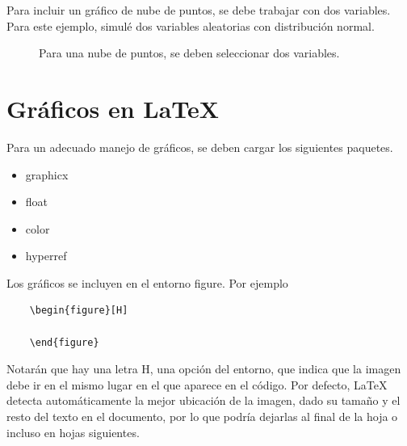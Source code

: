 \documentclass[letterpaper,11pt]{article}
\begin{document}
 Para incluir un gráfico de nube de puntos, se debe trabajar con dos variables. Para este ejemplo, simulé dos variables aleatorias con distribución normal.
 
 \begin{figure}[H]
 \centering
 \caption{Para una nube de puntos, se deben seleccionar dos variables.}
 \end{figure}

\section{Gráficos en \LaTeX{}}
Para un adecuado manejo de gráficos, se deben cargar los siguientes paquetes.
\begin{itemize}
	\item graphicx
	\item float
	\item color
	\item hyperref
\end{itemize}

Los gráficos se incluyen en el entorno {\ttfamily figure}. Por ejemplo

\begin{lstlisting}
	\begin{figure}[H]
		
	\end{figure}
\end{lstlisting}

Notarán que hay una letra H, una opción del entorno, que indica que la imagen debe ir en el mismo lugar en el que aparece en el código. Por defecto, \LaTeX{} detecta automáticamente la mejor ubicación de la imagen, dado su tamaño y el resto del texto en el documento, por lo que podría dejarlas al final de la hoja o incluso en hojas siguientes.
\end{document}
